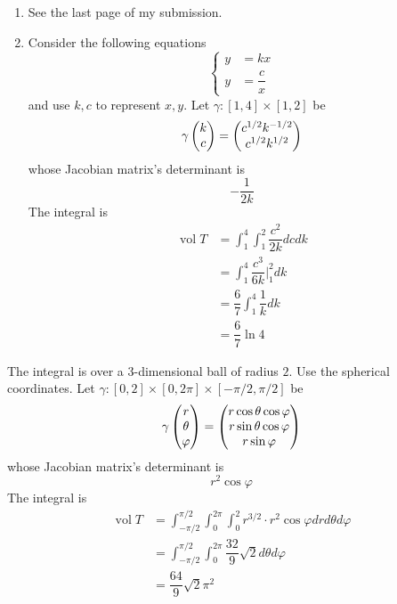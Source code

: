 \documentclass{homework}
\DeclareMathOperator{\vol}{vol}
\begin{document}
\begin{problem}{6}
\begin{enumerate}
\item See the last page of my submission.
\item
Consider the following equations
$$\left\{
\begin{aligned}
y&=kx \\
y&=\dfrac{c}{x}
\end{aligned}
\right.$$
and use $k, c$ to represent $x, y$. Let $\gamma : [1,4] \times [1,2]$ be
$$\gamma \begin{pmatrix}k\\c\end{pmatrix} = \begin{pmatrix}c^{1/2}k^{-1/2}\\c^{1/2}k^{1/2}\end{pmatrix}$$
whose Jacobian matrix's determinant is
$$-\dfrac{1}{2k}$$
The integral is
\begin{align*}
\vol{T}
&= \int_1^4\int_1^2 \dfrac{c^2}{2k} dcdk \\
&= \int_1^4 \dfrac{c^3}{6k}|_1^2 dk \\
&= \dfrac{6}{7} \int_1^4 \dfrac{1}{k} dk \\
&= \dfrac{6}{7} \ln 4
\end{align*}
\end{enumerate}
\end{problem}

\begin{problem}{7}
The integral is over a 3-dimensional ball of radius $2$. Use the spherical
coordinates. Let $\gamma : [0, 2] \times [0, 2\pi] \times [-\pi/2, \pi/2]$ be
$$\gamma \begin{pmatrix}r\\\theta\\\varphi\end{pmatrix} = \begin{pmatrix}
r\cos\theta\cos\varphi \\
r\sin\theta\cos\varphi \\
r\sin\varphi\end{pmatrix}$$
whose Jacobian matrix's determinant is
$$r^2\cos\varphi$$
The integral is
\begin{align*}
\vol{T}
&= \int_{-\pi/2}^{\pi/2}\int_0^{2\pi}\int_0^2
r^{3/2}\cdot r^2\cos\varphi drd\theta d\varphi \\
&= \int_{-\pi/2}^{\pi/2}\int_0^{2\pi} \dfrac{32}{9}\sqrt{2} d\theta d\varphi \\
&= \dfrac{64}{9}\sqrt{2}\pi^2
\end{align*}
\end{problem}
\end{document}
